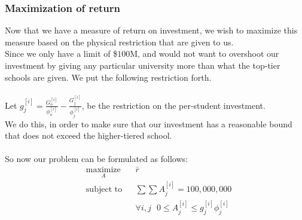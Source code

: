 \documentclass[12pt]{article}
\begin{document}
	\subsubsection{Maximization of return}
		Now that we have a measure of return on investment, we wish to maximize this measure based on the physical restriction that are given to us.\\
		Since we only have a limit of \$$100$M, and would not want to overshoot our investment by giving any particular university more than what the top-tier schools are given. We put the following restriction forth.\\
		\\
		Let $g_j^{[i]} = \frac{  G_o^{[i]}  }{  \phi_o^{[i]} } - \frac{  G_j^{[i]}  }{  \phi_j^{[i]} } $, be the restriction on the per-student investment.\\ 
		We do this, in order to make sure that our investment has a reasonable bound that does not exceed the higher-tiered school.\\
		\\
		So now our problem can be formulated as follows:
		\begin{equation*}
				\begin{aligned}
					& \underset{A}{\text{maximize}}
					& &\bar{r}\\
					& \text{subject to}
					& & \sum \sum A_j^{[i]} = 100,000,000 \\
					&&& \forall i,j \ \ \ 0\le A_j^{[i]} \le g_j^{[i]}\phi_j^{[i]}
				\end{aligned}
		\end{equation*}
\end{document}
